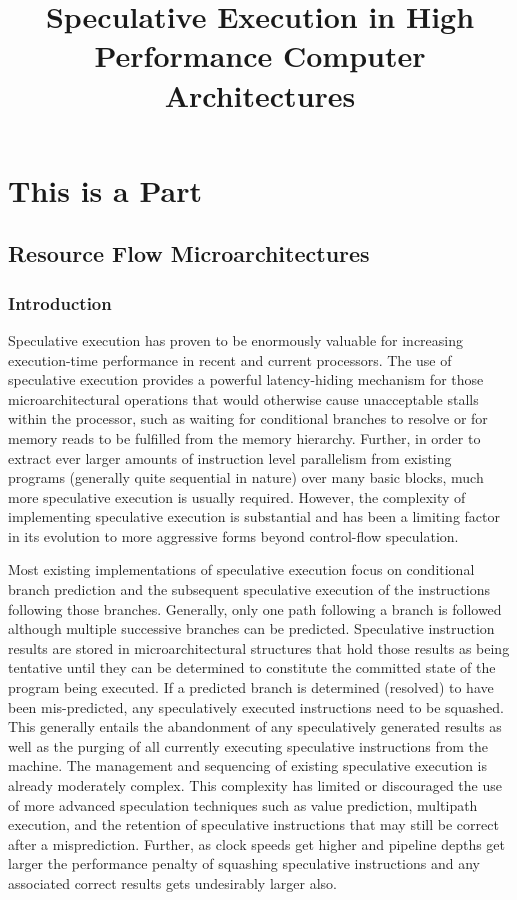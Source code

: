 \documentclass{book}
\begin{document}
\tableofcontents
\listoftables
\listoffigures
\part{This is a Part}
%
\title{Speculative Execution in High Performance Computer Architectures}
%
%
%
%
\setcounter{chapter}{15}
%
\chapter{Resource Flow Microarchitectures}
%
%
%
%
\section{Introduction}
%
Speculative execution has proven to be enormously valuable for
increasing execution-time performance in recent and current
processors.  The use of speculative execution provides a powerful
latency-hiding mechanism for those microarchitectural operations that
would otherwise cause unacceptable stalls within the processor, such as
waiting for conditional branches to resolve or for memory reads to be
fulfilled from the memory hierarchy.  
Further, in order to extract ever larger amounts of instruction
level parallelism from existing programs (generally quite sequential
in nature) over many basic blocks, much more speculative 
execution is usually required.
However, the complexity of
implementing speculative execution is substantial and has been a
limiting factor in its evolution to more aggressive forms beyond
control-flow speculation.

Most existing implementations of speculative execution focus on
conditional branch prediction and the subsequent speculative execution
of the instructions following those branches.  Generally, only one path
following a branch is followed although multiple successive branches
can be predicted.  Speculative instruction results are stored in
microarchitectural structures that hold those results as being
tentative until they can be determined to constitute the committed
state of the program being executed.  If a predicted branch is
determined (resolved) to have been mis-predicted, any speculatively
executed instructions need to be squashed.  This generally entails the
abandonment of any speculatively generated results as well as the
purging of all currently executing speculative instructions from the
machine.  The management and sequencing of existing speculative
execution is already moderately complex.  This complexity has
limited or discouraged the use of more advanced speculation techniques
such as value prediction, multipath execution, and the retention of
speculative instructions that may still be correct after a
misprediction.  Further, as clock speeds get higher and pipeline depths
get larger the performance penalty of squashing speculative
instructions and any associated correct results gets undesirably larger
also.
\end{document}

